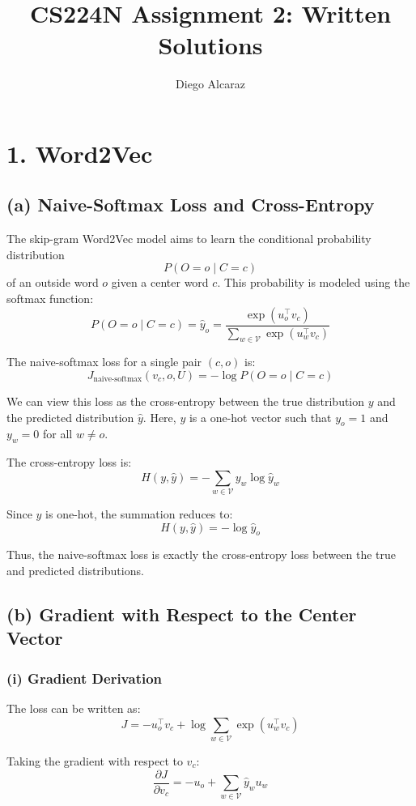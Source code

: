 \documentclass[11pt]{article}
\title{CS224N Assignment 2: Written Solutions}
\author{Diego Alcaraz}
\date{}
\begin{document}
\maketitle

\section*{1. Word2Vec}

\subsection*{(a) Naive-Softmax Loss and Cross-Entropy}

The skip-gram Word2Vec model aims to learn the conditional probability distribution
\[
P(O=o \mid C=c)
\]
of an outside word $o$ given a center word $c$. This probability is modeled using the softmax function:
\[
P(O=o \mid C=c) = \hat{y}_o = \frac{\exp(u_o^\top v_c)}{\sum_{w \in \mathcal{V}} \exp(u_w^\top v_c)}
\]

The naive-softmax loss for a single pair $(c,o)$ is:
\[
J_{\text{naive-softmax}}(v_c, o, U) = -\log P(O=o \mid C=c)
\]

We can view this loss as the cross-entropy between the true distribution $y$ and the predicted distribution $\hat{y}$.  
Here, $y$ is a one-hot vector such that $y_o = 1$ and $y_w = 0$ for all $w \neq o$.

The cross-entropy loss is:
\[
H(y, \hat{y}) = -\sum_{w \in \mathcal{V}} y_w \log \hat{y}_w
\]

Since $y$ is one-hot, the summation reduces to:
\[
H(y, \hat{y}) = -\log \hat{y}_o
\]

Thus, the naive-softmax loss is exactly the cross-entropy loss between the true and predicted distributions.

\subsection*{(b) Gradient with Respect to the Center Vector}

\subsubsection*{(i) Gradient Derivation}

The loss can be written as:
\[
J = -u_o^\top v_c + \log \sum_{w \in \mathcal{V}} \exp(u_w^\top v_c)
\]

Taking the gradient with respect to $v_c$:
\[
\frac{\partial J}{\partial v_c}
= -u_o + \sum_{w \in \mathcal{V}} \hat{y}_w u_w
\]
\end{document}
